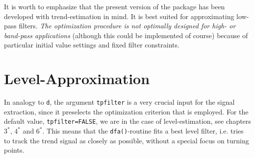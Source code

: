 \documentclass[a4paper]{article}
\begin{document}
It is worth to emphasize that the present version of the package has
been developed with trend-estimation in mind. It is best suited for
approximating low-pass filters. \emph{The optimization procedure is
  not optimally designed for high- or band-pass applications}
(although this could be implemented of course) because of particular
initial value settings and fixed filter constraints. 




\section{Level-Approximation}\label{levapp}

In analogy to \texttt{d}, the argument \texttt{tpfilter} is a very
crucial input for the signal extraction, since it preselects the
optimization criterion that is employed. For the default value,
\texttt{tpfilter=FALSE}, we are in the case of level-estimation, see
chapters $3^*$, $4^*$ and $6^*$. This means that the
\texttt{dfa()}-routine fits a best level filter, i.e.  tries to track
the trend signal as closely as possible, without a special focus on
turning points.\\
\end{document}
